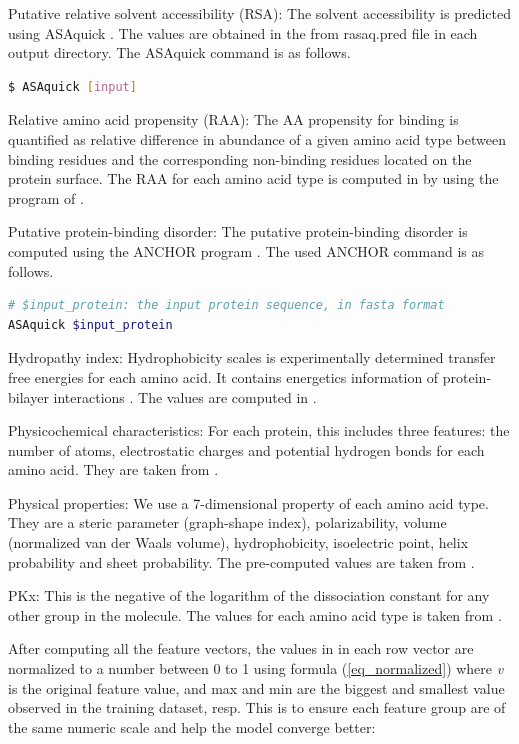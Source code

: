 Putative relative solvent accessibility (RSA): The solvent accessibility is predicted using ASAquick \cite{faraggi2014accurate}. The values are obtained in the from rasaq.pred file in each output directory. The ASAquick command is as follows.
\begin{lstlisting}[language=bash,frame=single]
$ ASAquick [input]
\end{lstlisting}


Relative amino acid propensity (RAA): The AA propensity for binding is quantified as relative difference in abundance of a given amino acid type between binding residues and the corresponding non-binding residues located on the protein surface. The RAA for each amino acid type is computed in \cite{zhang2019comprehensive} by using the program of  \cite{vacic2007composition}.

Putative protein-binding disorder: The putative protein-binding disorder is computed using the ANCHOR program \cite{dosztanyi2009anchor}. The used ANCHOR command is as follows.
\begin{lstlisting}[language=bash,frame=single]
# $input_protein: the input protein sequence, in fasta format
ASAquick $input_protein
\end{lstlisting}
Hydropathy index: Hydrophobicity scales is experimentally determined transfer free energies for each amino acid. It contains energetics information of protein-bilayer interactions \cite{wimley1996experimentally}. The values are computed in \cite{kyte1982simple}.

Physicochemical characteristics: For each protein, this includes three features: the number of atoms, electrostatic charges and potential hydrogen bonds for each amino acid. They are taken from \cite{zhang2019sequence}.

Physical properties: We use a 7-dimensional property of each amino acid type. They are a steric parameter (graph-shape index), polarizability, volume (normalized van der Waals volume), hydrophobicity, isoelectric point, helix probability and sheet probability. The pre-computed values are taken from \cite{zhang2019sequence}.

PKx: This is the negative of the logarithm of the dissociation constant for any other group in the molecule. The values for each amino acid type is taken from \cite{zhang2019sequence}.

After computing all the feature vectors, the values in in each row vector are normalized to a number between 0 to 1 using formula (\ref{eq_normalized}) where \textit{v} is the original feature value, and max and min are the biggest and smallest value observed in the training dataset, resp. This is to ensure each feature group are of the same numeric scale and help the model converge better:

